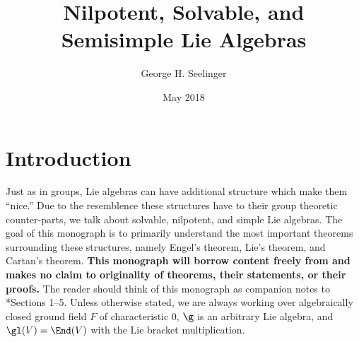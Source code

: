 \documentclass[11pt,leqno,oneside]{amsart}
\title[Nilpotent, Solvable, and Semisimple Lie Algebras]{Nilpotent,
  Solvable, and Semisimple Lie
Algebras}
\author{George H. Seelinger}
\date{May 2018}
\numberwithin{thm}{section}
\begin{document}
\maketitle
\section{Introduction}
Just as in groups, Lie algebras can have additional structure which
make them ``nice.'' Due to the resemblence these structures have to
their group theoretic counter-parts, we talk about solvable,
nilpotent, and simple Lie algebras. The goal of this monograph is to
primarily understand the most important theorems surrounding these
structures, namely Engel's theorem, Lie's theorem, and Cartan's
theorem. \textbf{This monograph will borrow content freely from \cite{humph}
and makes no claim to originality of theorems, their
statements, or their proofs.} The reader should think
of this monograph as companion notes to \cite{humph}*{Sections
  1--5}. Unless otherwise stated, we are always 
working over 
algebraically closed ground
field \(F\) of characteristic \(0\), \(\g\) is an arbitrary Lie
algebra, and \(\gl(V) 
= \End(V)\) with the Lie bracket multiplication. 
\end{document}
